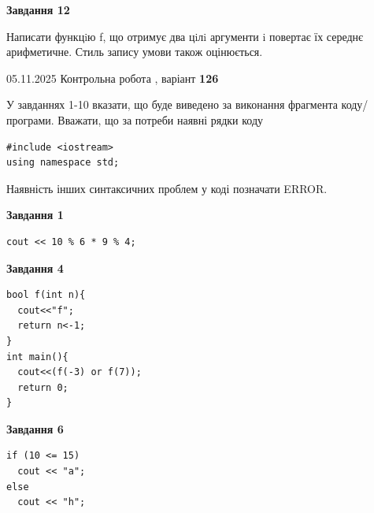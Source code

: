 \documentclass[12pt, ukrainian]{article}
\begin{document}
{\begin {large}
\begin{minipage}[t]{11.0cm}
\begin{center}
\textbf{Завдання 12}
\end{center}

Написати функцiю f, що отримує два цiлi аргументи i повертає їх середнє арифметичне. Стиль запису умови також оцінюється.\par

\end{minipage}

\end {large}}
\newpage

{\Large{05.11.2025 Контрольна робота , варіант  \No \textbf { 126 }\par}}
{
\begin {large}
У завданнях 1-10 вказати, що буде виведено за виконання фрагмента коду/про\-гра\-ми.
Вважати, що за потреби наявні рядки коду
\begin{verbatim}
#include <iostream>
using namespace std;
\end{verbatim}
Наявність інших синтаксичних проблем у коді позначати ERROR.

\begin{minipage}[t]{7.0cm}

\begin{center}
\textbf{Завдання 1}
\end{center}
\vspace{-8mm}

\begin{verbatim}
cout << 10 % 6 * 9 % 4;
\end{verbatim}



\begin{center}
\textbf{Завдання 4}
\end{center}
\vspace{-8mm}

\begin{verbatim}
bool f(int n){
  cout<<"f";
  return n<-1;
}
int main(){
  cout<<(f(-3) or f(7));
  return 0;
}
\end{verbatim}



\begin{center}
\textbf{Завдання 6}
\end{center}
\vspace{-8mm}

\begin{verbatim}
if (10 <= 15)
  cout << "a";
else
  cout << "h";
\end{verbatim}




\end{minipage}
\end{large}}
\end{document}

